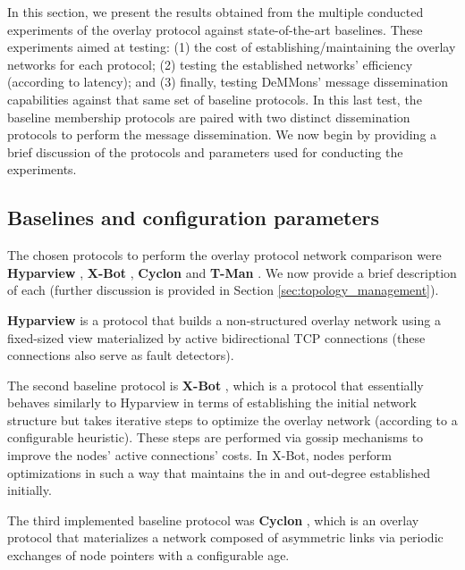 
In this section, we present the results obtained from the multiple conducted experiments of the overlay protocol against state-of-the-art baselines. These experiments aimed at testing: (1) the cost of establishing/maintaining the overlay networks for each protocol; (2) testing the established networks' efficiency (according to latency); and (3) finally, testing DeMMons' message dissemination capabilities against that same set of baseline protocols. In this last test, the baseline membership protocols are paired with two distinct dissemination protocols to perform the message dissemination. We now begin by providing a brief discussion of the protocols and parameters used for conducting the experiments.

\subsection{Baselines and configuration parameters}

The chosen protocols to perform the overlay protocol network comparison were \textbf{Hyparview} \cite{Hyparview}, \textbf{X-Bot} \cite{x-bot}, \textbf{Cyclon} \cite{voulgaris2005Cyclon} and \textbf{T-Man} \cite{t-man}. We now provide a brief description of each (further discussion is provided in Section \ref{sec:topology_management}).

\textbf{Hyparview} is a protocol that builds a non-structured overlay network using a fixed-sized view materialized by active bidirectional TCP connections (these connections also serve as fault detectors). 

The second baseline protocol is \textbf{X-Bot} \cite{x-bot}, which is a protocol that essentially behaves similarly to Hyparview in terms of establishing the initial network structure but takes iterative steps to optimize the overlay network (according to a configurable heuristic). These steps are performed via gossip mechanisms to improve the nodes' active connections' costs. In X-Bot, nodes perform optimizations in such a way that maintains the in and out-degree established initially. 

The third implemented baseline protocol was \textbf{Cyclon} \cite{voulgaris2005Cyclon}, which is an overlay protocol that materializes a network composed of asymmetric links via periodic exchanges of node pointers with a configurable age. 


